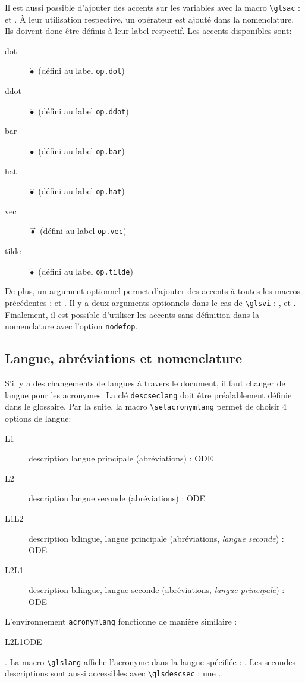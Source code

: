 \documentclass[projet,nohyperref,english,french]{ulthese}
\begin{document}
Il est aussi possible d'ajouter des accents sur les variables avec la macro \texttt{\textbackslash glsac} :  et . À leur utilisation respective, un opérateur est ajouté dans la nomenclature. Ils doivent donc être définis à leur label respectif. Les accents disponibles sont:
\begin{description} 
\item[dot] $\dot{\bullet}$ (défini au label \texttt{op.dot})
\item[ddot] $\ddot{\bullet}$ (défini au label \texttt{op.ddot})
\item[bar] $\bar{\bullet}$ (défini au label \texttt{op.bar})
\item[hat] $\widehat{\bullet}$ (défini au label \texttt{op.hat})
\item[vec] $\vec{\bullet}$ (défini au label \texttt{op.vec})
\item[tilde] $\widetilde{\bullet}$ (défini au label \texttt{op.tilde})
\end{description}
De plus, un argument optionnel permet d'ajouter des accents à toutes les macros précédentes :  et . Il y a deux arguments optionnels dans le cas de \texttt{\textbackslash glsvi} : ,  et . Finalement, il est possible d'utiliser les accents sans définition dans la nomenclature avec l'option \texttt{nodefop}.

\subsection{Langue, abréviations et nomenclature}

S'il y a des changements de langues à travers le document, il faut changer de langue pour les acronymes. La clé \texttt{descseclang} doit être préalablement définie dans le glossaire. Par la suite, la macro \texttt{\textbackslash setacronymlang} permet de choisir 4 options de langue: 
\begin{description}
	\item[L1] description langue principale (abréviations) : \acrfull{ODE}
	\item[L2] description langue seconde (abréviations) : \acrfull{ODE}
	\item[L1L2] description bilingue, langue principale (abréviations, \textit{langue seconde}) : \acrfull{ODE}
	\item[L2L1] description bilingue, langue seconde (abréviations, \textit{langue principale}) : \acrfull{ODE}
\end{description}
L'environnement \texttt{acronymlang} fonctionne de manière similaire : \begin{acronymlang}{L2L1}\acrfull{ODE}\end{acronymlang}. La macro \texttt{\textbackslash glslang} affiche l'acronyme dans la langue spécifiée : . Les secondes descriptions sont aussi accessibles avec \texttt{\textbackslash glsdescsec} : une .
\end{document}
